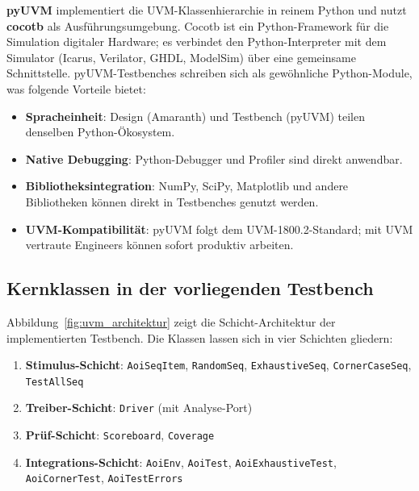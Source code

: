 ﻿\documentclass[12pt,a4paper]{report}
\begin{document}
\textbf{pyUVM} \cite{pyuvm2024} implementiert die UVM-Klassen\-hierarchie in
reinem Python und nutzt \textbf{cocotb} als Ausführungs\-umgebung. Cocotb ist ein
Python-Framework für die Simulation digitaler Hardware; es verbindet den
Python-Interpreter mit dem Simulator (Icarus, Verilator, GHDL, ModelSim) über
eine gemeinsame Schnittstelle. pyUVM-Testbenches schreiben sich als
gewöhnliche Python-Module, was folgende Vorteile bietet:

\begin{itemize}
    \item \textbf{Spracheinheit}: Design (Amaranth) und Testbench (pyUVM) teilen denselben Python-Ökosystem.
    \item \textbf{Native Debugging}: Python-Debugger und Profiler sind direkt anwendbar.
    \item \textbf{Bibliotheksintegration}: NumPy, SciPy, Matplotlib und andere
          Bibliotheken können direkt in Testbenches genutzt werden.
    \item \textbf{UVM-Kompatibilität}: pyUVM folgt dem UVM-1800.2-Standard; mit UVM
          vertraute Engineers können sofort produktiv arbeiten.
\end{itemize}

\subsection{Kernklassen in der vorliegenden Testbench}

Abbildung~\ref{fig:uvm_architektur} zeigt die Schicht-Architektur der
implementierten Testbench. Die Klassen lassen sich in vier Schichten gliedern:

\begin{enumerate}
    \item \textbf{Stimulus-Schicht}: \texttt{AoiSeqItem}, \texttt{RandomSeq},
          \texttt{ExhaustiveSeq}, \texttt{CornerCaseSeq}, \texttt{Test\newline AllSeq}
    \item \textbf{Treiber-Schicht}: \texttt{Driver} (mit Analyse-Port)
    \item \textbf{Prüf-Schicht}: \texttt{Scoreboard}, \texttt{Coverage}
    \item \textbf{Integrations-Schicht}: \texttt{AoiEnv}, \texttt{AoiTest},
          \texttt{AoiExhaustiveTest}, \texttt{AoiCornerTest}, \texttt{AoiTestErrors}
\end{enumerate}
\end{document}
